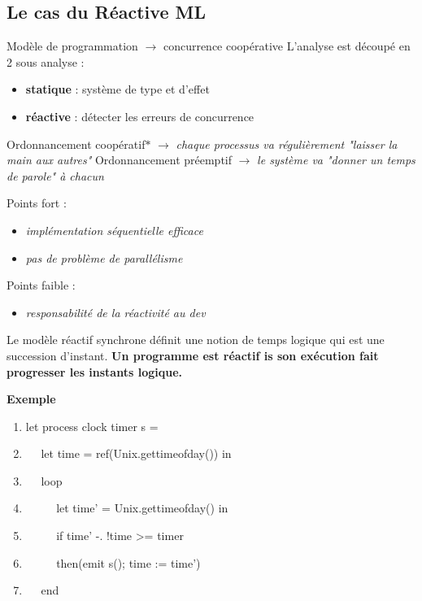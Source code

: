 \documentclass[10pt,a4paper]{article}
\begin{document}
		\subsection{Le cas du Réactive ML}
			Modèle de programmation $\longrightarrow$ concurrence coopérative 
			\smallbreak
			L'analyse est découpé en 2 sous analyse :
			\begin{itemize}
				\item \textbf{statique} : système de type et d'effet
				\item \textbf{réactive} : détecter les erreurs de concurrence
			\end{itemize}
			\bigbreak
			
			
			Ordonnancement coopératif$\ast$ $\longrightarrow$ \textit{\small{chaque processus va r\'{e}guli\`{e}rement "laisser la main aux autres"}}
			\smallbreak
			Ordonnancement pr\'{e}emptif $\longrightarrow$ \textit{\small{le syst\`{e}me va "donner un temps de parole" \`{a} chacun}}
			\medbreak
				
			Points fort :
			\begin{itemize}
				\item \textit{\small{impl\'{e}mentation s\'{e}quentielle efficace}}
				\item \textit{\small{pas de probl\`{e}me de parall\'{e}lisme}}
			\end{itemize}
			\medbreak
				
			Points faible : 
			\begin{itemize}
				\item \textit{\small{responsabilit\'{e} de la r\'{e}activit\'{e} au dev}}
			\end{itemize}
			\medbreak
				
			Le mod\`{e}le r\'{e}actif synchrone d\'{e}finit une notion de temps logique qui est une succession d'instant.
			\smallbreak
			\textbf{Un programme est r\'{e}actif is son ex\'{e}cution fait progresser les instants logique.}
			\medbreak
				
			\textbf{Exemple}
			\medbreak
				
			\begin{enumerate}
			 	\item let process clock timer s =
			 	\item $\quad$ let time = ref(Unix.gettimeofday()) in
			 	\item $\quad$ loop
			 	\item $\quad$ $\quad$ let time' = Unix.gettimeofday() in
			 	\item $\quad$ $\quad$ if time' -. !time >= timer
			 	\item $\quad$ $\quad$ then(emit s(); time := time')
			 	\item $\quad$ end 
		 	\end{enumerate}
			\medbreak
				
\end{document}
